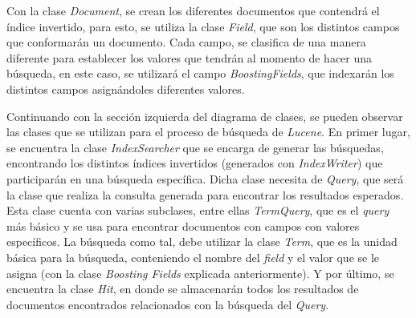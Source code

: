 \documentclass{memoria}
\begin{document}
Con la clase \textsl{Document}, se crean los diferentes documentos que contendrá el índice invertido, para esto, se utiliza la clase \textsl{Field}, que son los distintos campos que conformarán un documento. Cada campo, se clasifica de una manera diferente para establecer los valores que tendrán al momento de hacer una búsqueda, en este caso, se utilizará el campo \textsl{BoostingFields}, que indexarán los distintos campos asignándoles diferentes valores.
    
\newpage
{}

Continuando con la sección izquierda del diagrama de clases, se pueden observar las clases que se utilizan para el proceso de búsqueda de \textsl{Lucene}. En primer lugar, se encuentra la clase \textsl{IndexSearcher} que se encarga de generar las búsquedas, encontrando los distintos índices invertidos (generados con \textsl{IndexWriter}) que participarán en una búsqueda específica. Dicha clase necesita de \textsl{Query}, que será la clase que realiza la consulta generada para encontrar los resultados esperados. Esta clase cuenta con varias subclases, entre ellas \textsl{TermQuery}, que es el \textsl{query} más básico y se usa para encontrar documentos con campos con valores específicos. La búsqueda como tal, debe utilizar la clase \textsl{Term}, que es la unidad básica para la búsqueda, conteniendo el nombre del \textsl{field} y el valor que se le asigna (con la clase \textsl{Boosting Fields} explicada anteriormente). Y por último, se encuentra la clase \textsl{Hit}, en donde se almacenarán todos los resultados de documentos encontrados relacionados con la búsqueda del \textsl{Query}. 
\end{document}
